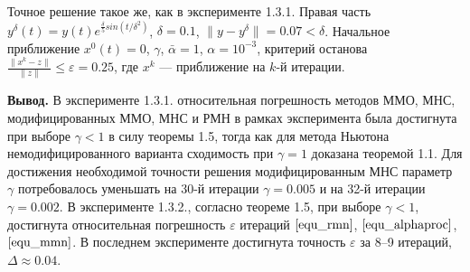 Точное решение такое же, как в эксперименте 1.3.1. Правая часть $y^\delta(t)=y(t)e^{\frac{\delta}{5} sin(t/{\delta}^2)}$, $\delta=0.1$, $\|y-y^{\delta}\|=0.07<\delta$. Начальное приближение $x^0(t)=0$, $\gamma$, $\bar\alpha=1$, $\alpha=10^{-3}$, критерий останова $\frac{\|x^k-z\|}{\|z\|}\le\varepsilon=0.25$, где $x^k$ --- приближение на $k$-й итерации.

{\bfseries\large Вывод.} В эксперименте 1.3.1. относительная погрешность методов ММО, МНС, модифицированных ММО, МНС и РМН в рамках эксперимента была достигнута при выборе $\gamma<1$ в силу теоремы 1.5, тогда как для метода Ньютона немодифицированного варианта сходимость при $\gamma=1$ доказана теоремой 1.1. Для достижения необходимой точности решения модифицированным МНС параметр $\gamma$ потребовалось уменьшать на 30-й итерации $\gamma=0.005$ и на 32-й итерации $\gamma=0.002$.
В эксперименте 1.3.2., согласно теореме 1.5, при выборе $\gamma<1$, достигнута относительная погрешность $\varepsilon$ итераций $\eqref{equ_rmn}$, $\eqref{equ_alphaproc}$, $\eqref{equ_mmn}$. 
В последнем эксперименте  достигнута точность $\varepsilon$ за 8--9 итераций, $\Delta\approx 0.04$.

%

